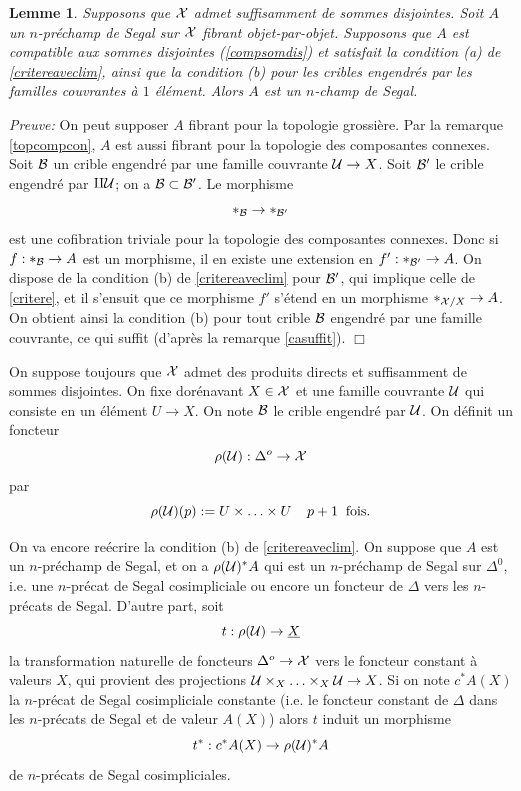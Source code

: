 \documentclass[12pt]{article}
\newcommand{\eop}{\hfill $\Box$\vspace{.1in}}
\newtheorem{lemme}[lemma]{Lemme}
\newcommand{\Bb}{{\cal B}}
\newcommand{\Uu}{{\cal U}}
\newcommand{\Xx}{{\cal X}}
\begin{document}
\begin{lemme}
\label{unseul}
Supposons que $\Xx$ admet suffisamment de sommes disjointes.
Soit $A$ un $n$-pr\'echamp de Segal sur $\Xx$ fibrant objet-par-objet.
Supposons que $A$ est compatible aux sommes disjointes (\ref{compsomdis})
et satisfait la condition (a) de \ref{critereaveclim}, ainsi que la
condition (b) pour les cribles engendr\'es par les familles couvrantes \`a
$1$ \'el\'ement. Alors $A$ est un $n$-champ de Segal.
\end{lemme}
{\em Preuve:}
On peut supposer $A$ fibrant pour la topologie grossi\`ere. Par la remarque
\ref{topcompcon}, $A$ est aussi fibrant pour la topologie des composantes
connexes. Soit $\Bb$ un crible engendr\'e par une famille couvrante $\Uu
\rightarrow X$. Soit $\Bb '$ le crible engendr\'e par $\amalg \Uu$; on a $\Bb
\subset \Bb '$. Le morphisme
$$
\ast _{\Bb}\rightarrow \ast _{\Bb '}
$$
est une cofibration triviale pour la topologie des composantes connexes.
Donc si $f:\ast _{\Bb}\rightarrow A$ est un morphisme, il en existe une
extension en $f':\ast _{\Bb '}\rightarrow A$. On dispose de la condition (b) de
\ref{critereaveclim} pour $\Bb '$, qui
implique celle
de  \ref{critere}, et il s'ensuit que ce morphisme $f'$ s'\'etend en un
morphisme $\ast _{\Xx /X}\rightarrow A$. On obtient ainsi la condition (b) pour
tout crible $\Bb$ engendr\'e par une famille couvrante, ce qui suffit
(d'apr\`es la remarque \ref{casuffit}).
\eop

\bigskip

On suppose toujours que $\Xx$ admet des
produits directs et suffisamment de sommes
disjointes. On fixe dor\'enavant $X\in \Xx$ et une famille couvrante $\Uu$ qui
consiste en un \'el\'ement $U\rightarrow X$. On note $\Bb$ le crible
engendr\'e par $\Uu$. On d\'efinit un foncteur
$$
\rho (\Uu ): \Delta ^o \rightarrow \Xx
$$
par
$$
\rho (\Uu )(p):= U\times \ldots \times U \;\;\;\; p+1\;\;
\mbox{fois}.
$$


On va encore re\'ecrire la condition (b) de \ref{critereaveclim}. On suppose
que $A$ est un $n$-pr\'echamp de Segal, et on a $\rho (\Uu
)^{\ast }A$ qui est un $n$-pr\'echamp de Segal sur $\Delta ^0$, i.e. une
$n$-pr\'ecat
de Segal cosimpliciale ou encore un foncteur de $\Delta$ vers les
$n$-pr\'ecats de
Segal. D'autre part, soit
$$
t: \rho (\Uu )\rightarrow \underline{X}
$$
la transformation naturelle de foncteurs $\Delta ^o\rightarrow \Xx$ vers le
foncteur constant \`a valeurs $X$, qui provient des projections $\Uu \times
_X\ldots \times _X\Uu \rightarrow X$. Si on note $c^{\ast} A(X)$ la
$n$-pr\'ecat de Segal cosimpliciale constante (i.e. le foncteur
constant de $\Delta$ dans
les $n$-pr\'ecats de Segal et de valeur $A(X)$) alors $t$ induit
un morphisme
$$
t^{\ast} : c^{\ast}A(X) \rightarrow  \rho (\Uu )^{\ast }A
$$
de $n$-pr\'ecats de Segal cosimpliciales.
\end{document}

